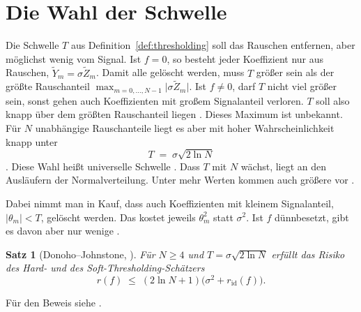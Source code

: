 \documentclass[a4paper,11pt,bibliography=totoc,listof=totoc,headinclude=true,cleardoublepage=empty,oneside]{scrbook}
\theoremstyle{plain}
\newtheorem{Satz}{Satz}[chapter]
\theoremstyle{definition}
\begin{document}
\section{Die Wahl der Schwelle}
\label{sec:universelle-schwelle}
 
Die Schwelle $T$ aus Definition~\ref{def:thresholding} soll das Rauschen
entfernen, aber möglichst wenig vom Signal.
Ist $f = 0$, so besteht jeder Koeffizient nur aus Rauschen,
$\tilde Y_m = \sigma\tilde Z_m$. Damit alle gelöscht werden, muss $T$ grö\ss er
sein als der grö\ss te Rauschanteil
$\max_{m=0,\dots,N-1}\lvert\sigma\tilde Z_m\rvert$. Ist $f\neq0$, darf $T$
nicht viel grö\ss er sein, sonst gehen auch Koeffizienten mit gro\ss em
Signalanteil verloren. $T$ soll also knapp über dem grö\ss ten Rauschanteil
liegen \cite[Kap.~11.2.2]{mallat}. %
Dieses Maximum ist unbekannt. Für $N$ unabhängige Rauschanteile liegt es aber
mit hoher Wahrscheinlichkeit knapp unter
\begin{equation}
\label{eq:universelle-schwelle}
  T \;=\; \sigma\sqrt{2\ln N}
\end{equation}
\cite[Gl.~(11.64)]{mallat}. %
Diese Wahl hei\ss t universelle Schwelle \cite[Kap.~11.3.2]{mallat}. %
Dass $T$ mit $N$ wächst, liegt an den Ausläufern der Normalverteilung. Unter
mehr Werten kommen auch grö\ss ere vor \cite[Kap.~11.2.2]{mallat}. %

Dabei nimmt man in Kauf, dass auch Koeffizienten mit kleinem Signalanteil,
$\lvert\theta_m\rvert < T$, gelöscht werden. Das kostet jeweils $\theta_m^2$
statt $\sigma^2$. Ist $f$ dünnbesetzt, gibt es davon aber nur wenige
\cite[Kap.~11.2.2]{mallat}. %
 
\begin{Satz}[Donoho--Johnstone, {\cite[Satz~11.7]{mallat}}] %
\label{satz:donoho-johnstone}
Für $N\ge4$ und $T = \sigma\sqrt{2\ln N}$ erfüllt das Risiko des Hard- und des
Soft-Thresholding-Schätzers
\begin{equation}
\label{eq:donoho-johnstone}
  r(f) \;\le\; (2\ln N + 1)\bigl(\sigma^2 + r_{\mathrm{id}}(f)\bigr).
\end{equation}
\end{Satz}
 
Für den Beweis siehe \cite[Satz~11.7, Lemma~11.1]{mallat}. %
\end{document}
